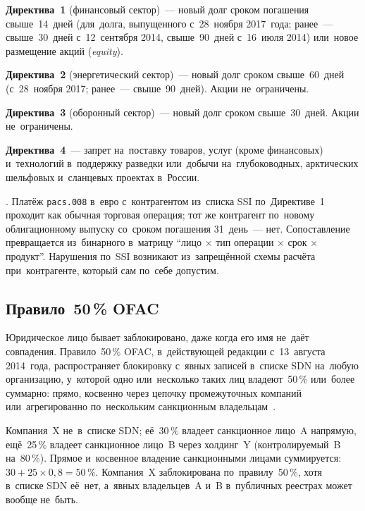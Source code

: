 \textbf{Директива~1} (финансовый сектор)~--- новый долг сроком погашения
свыше~14~дней (для~долга, выпущенного с~28~ноября 2017~года; ранее~---
свыше~30~дней с~12~сентября 2014, свыше~90~дней с~16~июля 2014) или~новое
размещение акций (\textit{equity}).

\textbf{Директива~2} (энергетический сектор)~--- новый долг сроком
свыше~60~дней (с~28~ноября 2017; ранее~--- свыше~90~дней). Акции
не~ограничены.

\textbf{Директива~3} (оборонный сектор)~--- новый долг сроком свыше~30~дней.
Акции не~ограничены.

\textbf{Директива~4}~--- запрет на~поставку товаров, услуг (кроме финансовых)
и~технологий в~поддержку разведки или~добычи на~глубоководных, арктических
шельфовых и~сланцевых проектах в~России.

. Платёж \texttt{pacs.008}
в~евро с~контрагентом из~списка SSI по~Директиве~1 проходит как обычная торговая операция;
тот же контрагент по~новому облигационному выпуску со~сроком погашения
31~день~--- нет. Сопоставление превращается из~бинарного в~матрицу
\enquote{лицо $\times$ тип операции $\times$ срок $\times$ продукт}. Нарушения
по~SSI возникают из~запрещённой схемы расчёта при~контрагенте, который сам
по~себе допустим.

\subsection*{Правило~50\,\% OFAC}

Юридическое лицо бывает заблокировано, даже когда его имя не~даёт совпадения.
Правило~50\,\% OFAC,
в~действующей редакции с~13~августа 2014~года, распространяет блокировку
с~явных записей в~списке SDN на~любую организацию, у~которой одно или~несколько таких лиц
владеют~50\,\% или~более суммарно: прямо, косвенно через цепочку промежуточных компаний
или~агрегированно по~нескольким санкционным
владельцам~\cite{ofac-50-rule-guidance}.

Компания~X не~в~списке SDN; её~30\,\% владеет санкционное лицо~A напрямую, ещё~25\,\%
владеет санкционное лицо~B через холдинг~Y (контролируемый~B на~80\,\%). Прямое
и~косвенное владение санкционными лицами суммируется: $30 + 25 \times 0{,}8 = 50\,\%$.
Компания~X заблокирована по~правилу~50\,\%, хотя в~списке SDN её~нет, а~явных
владельцев~A и~B в~публичных реестрах может вообще не~быть.

